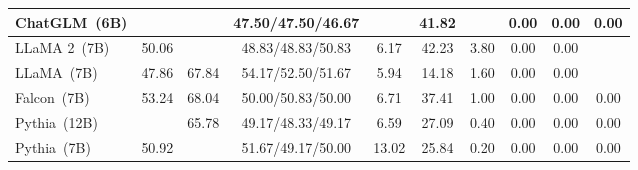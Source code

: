 \begin{table*}[htb]
{\begin{tabular}{lccccccccc}
ChatGLM~(6B) & \cellcolor[HTML]{A7CBE2}{63.53} & \cellcolor[HTML]{C6DEED}{50.53} & 47.50/47.50/46.67 & \cellcolor[HTML]{92BFDB}{2.89} & {41.82} & \cellcolor[HTML]{E5F0F7}{4.00} & {0.00} & {0.00} & {0.00}\\
\midrule
LLaMA 2~(7B) & 50.06 & \cellcolor[HTML]{C4DDEC}{51.39} & 48.83/48.83/50.83 & 6.17 & \cellcolor[HTML]{E5F0F7}42.23 & 3.80 & 0.00 & 0.00 & \cellcolor[HTML]{C4DDEC}{0.11} \\
LLaMA~(7B) & {47.86} & {67.84} & \cellcolor[HTML]{92BFDB}54.17/{52.50}/51.67 & {5.94} & {14.18} & {1.60} & {0.00} & {0.00} & \cellcolor[HTML]{C4DDEC}{0.11}\\
Falcon~(7B) & {53.24} & {68.04} & \cellcolor[HTML]{E5F0F7}50.00/50.83/50.00 & {6.71} & {37.41} & {1.00} & {0.00} & {0.00} & {0.00}\\
Pythia~(12B) & \cellcolor[HTML]{E5F0F7}{54.47} & {65.78} & 49.17/48.33/49.17 & {6.59} & {27.09} & {0.40} & {0.00} & {0.00} & {0.00}\\
Pythia~(7B) & {50.92} & \cellcolor[HTML]{E5F0F7}{64.79} & \cellcolor[HTML]{C4DDEC}51.67/49.17/50.00 & {13.02} & {25.84}  & {0.20} & {0.00} & {0.00} & {0.00}\\
\bottomrule\end{tabular}
}
\end{table*}



